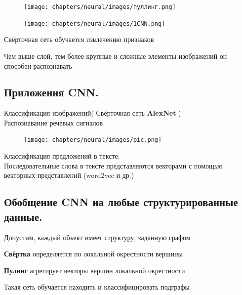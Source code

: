 \begin{description}
\begin{figure}[h]
\centering

\texttt{[image: chapters/neural/images/пуллинг.png]}

\label{fig:pulling}

\end{figure}

\begin{figure}[h]

\centering

\texttt{[image: chapters/neural/images/1CNN.png]}

\label{fig:one_cnn}

\end{figure}

Свёрточная сеть обучается извлечению признаков

Чем выше слой, тем более крупные и сложные элементы изображений он способен распознавать

\newpage
\subsection{Приложения CNN.}

Классификация изображений( Свёрточная сеть \textbf{AlexNet} )\\

Распознавание речевых сигналов\\
\begin{figure}[h]

\centering

\texttt{[image: chapters/neural/images/pic.png]}

\label{fig:voice_signals_nn}

\end{figure}

Классификация предложений в тексте:\\
Последовательные слова в тексте представляются векторами с помощью векторных представлений (word2vec и др.)\\

\newpage
\subsection{Обобщение CNN на любые структурированные данные.}
Допустим, каждый объект имеет структуру, заданную графом

\textbf{Свёртка} определяется по локальной окрестности вершины

\textbf{Пулинг} агрегирует векторы вершин локальной окрестности

Такая сеть обучается находить и классифицировать подграфы


\end{description}
